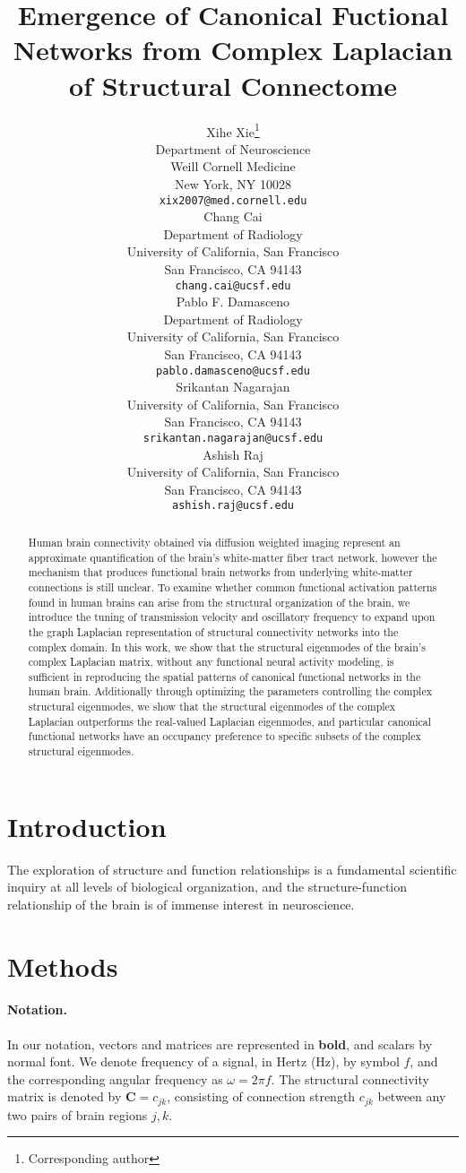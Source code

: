 \documentclass{article}
\title{Emergence of Canonical Fuctional Networks from Complex Laplacian of Structural Connectome}
\author{
  Xihe Xie\thanks{Corresponding author} \\
  Department of Neuroscience\\
  Weill Cornell Medicine\\
  New York, NY 10028 \\
  \texttt{xix2007@med.cornell.edu} \\
   \And
  Chang Cai \\
  Department of Radiology\\
  University of California, San Francisco\\
  San Francisco, CA 94143\\
  \texttt{chang.cai@ucsf.edu} \\
   \And
  Pablo F. Damasceno \\
  Department of Radiology\\
  University of California, San Francisco\\
  San Francisco, CA 94143\\
  \texttt{pablo.damasceno@ucsf.edu}\\
  \And
  Srikantan Nagarajan \\
  University of California, San Francisco\\
  San Francisco, CA 94143\\
  \texttt{srikantan.nagarajan@ucsf.edu} \\
  \And
  Ashish Raj \\
  University of California, San Francisco\\
  San Francisco, CA 94143\\
  \texttt{ashish.raj@ucsf.edu} \\
}
\begin{document}
\maketitle

\begin{abstract}
Human brain connectivity obtained via diffusion weighted imaging represent an approximate quantification of the brain's white-matter fiber tract network, however the mechanism that produces functional brain networks from underlying white-matter connections is still unclear. To examine whether common functional activation patterns found in human brains can arise from the structural organization of the brain, we introduce the tuning of transmission velocity and oscillatory frequency to expand upon the graph Laplacian representation of structural connectivity networks into the complex domain. In this work, we show that the structural eigenmodes of the brain's complex Laplacian matrix, without any functional neural activity modeling, is sufficient in reproducing the spatial patterns of canonical functional networks in the human brain. Additionally through optimizing the parameters controlling the complex structural eigenmodes, we show that the structural eigenmodes of the complex Laplacian outperforms the real-valued Laplacian eigenmodes, and particular canonical functional networks have an occupancy preference to specific subsets of the complex structural eigenmodes.
\end{abstract}




\section{Introduction}
The exploration of structure and function relationships is a fundamental scientific inquiry at all levels of biological organization, and the structure-function relationship of the brain is of immense interest in neuroscience. 


\section{Methods}
\label{sec:methods}

\paragraph{Notation.} In our notation, vectors and matrices are represented in \textbf{bold}, and scalars by normal font. We denote frequency of a signal, in Hertz (Hz), by symbol $f$, and the corresponding angular frequency as $\omega = 2 \pi f$. The structural connectivity matrix is denoted by $\bm{C} = c_{jk}$, consisting of connection strength $c_{jk}$ between any two pairs of brain regions $j,k$.
\end{document}
